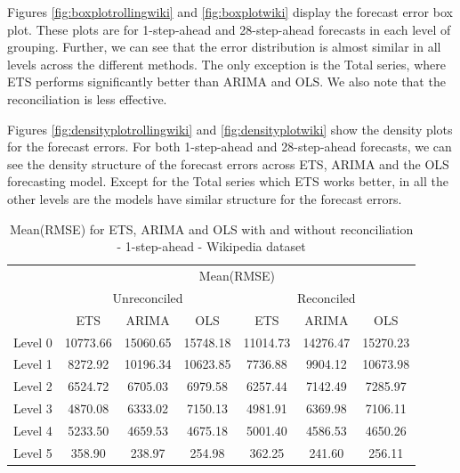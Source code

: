 \documentclass[11pt,a4paper,]{article}
\begin{document}
Figures \ref{fig:boxplotrollingwiki} and \ref{fig:boxplotwiki} display the forecast error box plot. These plots are for 1-step-ahead and 28-step-ahead forecasts in each level of grouping. Further, we can see that the error distribution is almost similar in all levels across the different methods. The only exception is the Total series, where ETS performs significantly better than ARIMA and OLS. We also note that the reconciliation is less effective.

Figures \ref{fig:densityplotrollingwiki} and \ref{fig:densityplotwiki} show the density plots for the forecast errors. For both 1-step-ahead and 28-step-ahead forecasts, we can see the density structure of the forecast errors across ETS, ARIMA and the OLS forecasting model. Except for the Total series which ETS works better, in all the other levels are the models have similar structure for the forecast errors.

\begin{table}[t]

\caption{\label{tab:wikipediadataresulrolling}Mean(RMSE) for ETS, ARIMA and OLS with and without reconciliation - 1-step-ahead - Wikipedia dataset}
\centering
\begin{tabular}{ccccccc}
\toprule
\multicolumn{1}{c}{} & \multicolumn{6}{c}{Mean(RMSE)} \\
\cmidrule(l{3pt}r{3pt}){2-7}
\multicolumn{1}{c}{} & \multicolumn{3}{c}{Unreconciled} & \multicolumn{3}{c}{Reconciled} \\
\cmidrule(l{3pt}r{3pt}){2-4} \cmidrule(l{3pt}r{3pt}){5-7}
 & ETS & ARIMA & OLS & ETS & ARIMA & OLS\\
\midrule
Level 0 & 10773.66 & 15060.65 & 15748.18 & 11014.73 & 14276.47 & 15270.23\\
Level 1 & 8272.92 & 10196.34 & 10623.85 & 7736.88 & 9904.12 & 10673.98\\
Level 2 & 6524.72 & 6705.03 & 6979.58 & 6257.44 & 7142.49 & 7285.97\\
Level 3 & 4870.08 & 6333.02 & 7150.13 & 4981.91 & 6369.98 & 7106.11\\
Level 4 & 5233.50 & 4659.53 & 4675.18 & 5001.40 & 4586.53 & 4650.26\\
Level 5 & 358.90 & 238.97 & 254.98 & 362.25 & 241.60 & 256.11\\
\bottomrule
\end{tabular}
\end{table}
\end{document}
